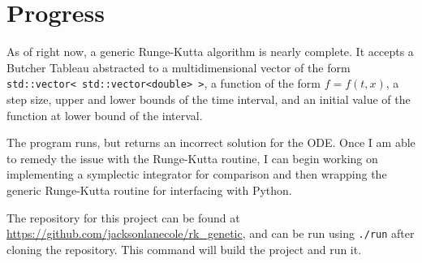\documentclass[onecolumn,titlepage,letterpaper,10pt]{article}
\newcommand{\functionof}[2]{#1\left(#2\right)}
\begin{document}
\section{Progress}
As of right now, a generic Runge-Kutta algorithm is nearly complete. It accepts
a Butcher Tableau abstracted to a multidimensional vector of the form
\texttt{std::vector< std::vector<double> >}, a function of the form $f =
\functionof{f}{t, x}$, a step size, upper and lower bounds of the time
interval, and an initial value of the function at lower bound of the interval.

The program runs, but returns an incorrect solution for the ODE. Once I am able
to remedy the issue with the Runge-Kutta routine, I can begin working on
implementing a symplectic integrator for comparison and then wrapping the
generic Runge-Kutta routine for interfacing with Python.

The repository for this project can be found at
\url{https://github.com/jacksonlanecole/rk_genetic}, and can be run using
\texttt{./run} after cloning the repository. This command will build the project
and run it.


\clearpage

%
%
%
\end{document}
